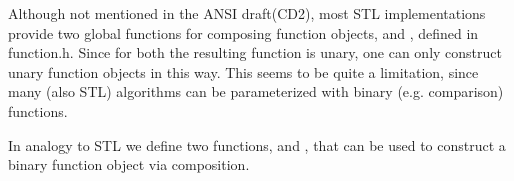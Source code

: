 
% 
% 
% 
% 
% 



Although not mentioned in the ANSI draft(CD2), most STL
implementations provide two global functions for composing function
objects,  and , defined in
function.h. Since for both the resulting function is unary, one can
only construct unary function objects in this way. This seems to be
quite a limitation, since many (also STL) algorithms can be
parameterized with binary (e.g. comparison) functions.

In analogy to STL  we define two functions,
 and , that can be
used to construct a binary function object via composition.

